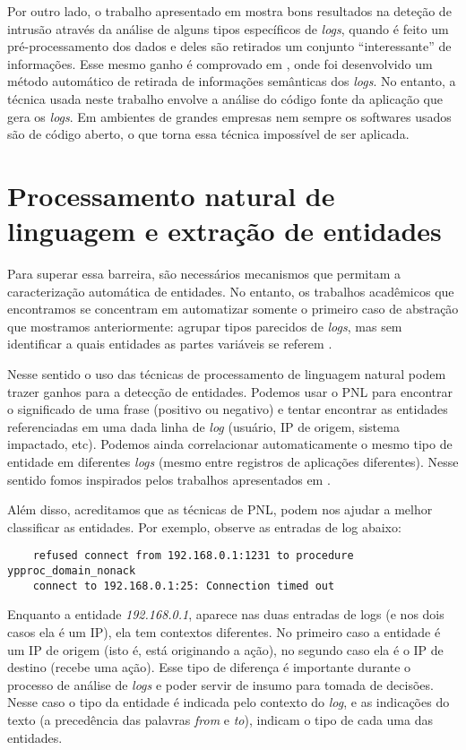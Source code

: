 \documentclass[
	12pt,				%
	openright,			%
	twoside,			%
	a4paper,			%
	english,			%
	spanish,			%
	brazil,				%
	]{abntex2}
\begin{document}
Por outro lado, o trabalho apresentado em \cite{yen2013beehive} mostra bons resultados na deteção de intrusão através da análise de alguns tipos específicos de \emph{logs}, quando é feito um pré-processamento dos dados e deles são retirados um conjunto ``interessante'' de informações. Esse mesmo ganho é comprovado em \cite{xu2009detecting}, onde foi desenvolvido um método automático de retirada de informações semânticas dos \emph{logs}. No entanto, a técnica usada neste trabalho envolve a análise do código fonte da aplicação que gera os \emph{logs}. Em ambientes de grandes empresas nem sempre os softwares usados são de código aberto, o que torna essa técnica impossível de ser aplicada.

\section{Processamento natural de linguagem e extração de entidades}
Para superar essa barreira, são necessários mecanismos que permitam a caracterização automática de entidades. No entanto, os trabalhos acadêmicos que encontramos se concentram em automatizar somente o primeiro caso de abstração que mostramos anteriormente: agrupar tipos parecidos de \emph{logs}, mas sem identificar a quais entidades as partes variáveis se referem \cite{vaarandi2003data, nagappan2010abstracting}.

Nesse sentido o uso das técnicas de processamento de linguagem natural podem trazer ganhos para a detecção de entidades. Podemos usar o PNL para encontrar o significado de uma frase (positivo ou negativo) e tentar encontrar as entidades referenciadas em uma dada linha de \emph{log} (usuário, IP de origem, sistema impactado, etc). Podemos ainda correlacionar automaticamente o mesmo tipo de entidade em diferentes \emph{logs} (mesmo entre registros de aplicações diferentes).  Nesse sentido fomos inspirados pelos trabalhos apresentados em \cite{matos2010environment, duque2012processo}.

Além disso, acreditamos que as técnicas de PNL, podem nos ajudar a melhor classificar as entidades. Por exemplo, observe as entradas de log abaixo:

{\tiny
	\begin{verbatim}
	refused connect from 192.168.0.1:1231 to procedure ypproc_domain_nonack
	connect to 192.168.0.1:25: Connection timed out
	\end{verbatim}
}

Enquanto a entidade \emph{192.168.0.1}, aparece nas duas entradas de logs (e nos dois casos ela é um IP), ela tem contextos diferentes. No primeiro caso a entidade é um IP de origem (isto é, está originando a ação), no segundo caso ela é o IP de destino (recebe uma ação). Esse tipo de diferença é importante durante o processo de análise de \emph{logs} e poder servir de insumo para tomada de decisões. Nesse caso o tipo da entidade é indicada pelo contexto do \emph{log}, e as indicações do texto (a precedência das palavras \emph{from} e \emph{to}), indicam o tipo de cada uma das entidades.
\end{document}
